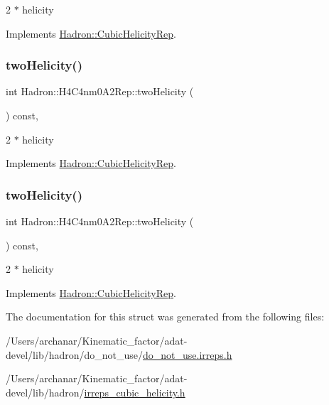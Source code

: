 2 $\ast$ helicity 

Implements \mbox{\hyperlink{structHadron_1_1CubicHelicityRep_af507aa56fc2747eacc8cb6c96db31ecc}{Hadron\+::\+Cubic\+Helicity\+Rep}}.

\mbox{\label{structHadron_1_1H4C4nm0A2Rep_a347b2b7af8f9ebd8468f2de11f0b6894}} 
\subsubsection{\texorpdfstring{twoHelicity()}{twoHelicity()}\hspace{0.1cm}{\footnotesize\ttfamily [2/3]}}
{\footnotesize\ttfamily int Hadron\+::\+H4\+C4nm0\+A2\+Rep\+::two\+Helicity (\begin{DoxyParamCaption}{ }\end{DoxyParamCaption}) const\hspace{0.3cm}{\ttfamily [inline]}, {\ttfamily [virtual]}}

2 $\ast$ helicity 

Implements \mbox{\hyperlink{structHadron_1_1CubicHelicityRep_af507aa56fc2747eacc8cb6c96db31ecc}{Hadron\+::\+Cubic\+Helicity\+Rep}}.

\mbox{\label{structHadron_1_1H4C4nm0A2Rep_a347b2b7af8f9ebd8468f2de11f0b6894}} 
\subsubsection{\texorpdfstring{twoHelicity()}{twoHelicity()}\hspace{0.1cm}{\footnotesize\ttfamily [3/3]}}
{\footnotesize\ttfamily int Hadron\+::\+H4\+C4nm0\+A2\+Rep\+::two\+Helicity (\begin{DoxyParamCaption}{ }\end{DoxyParamCaption}) const\hspace{0.3cm}{\ttfamily [inline]}, {\ttfamily [virtual]}}

2 $\ast$ helicity 

Implements \mbox{\hyperlink{structHadron_1_1CubicHelicityRep_af507aa56fc2747eacc8cb6c96db31ecc}{Hadron\+::\+Cubic\+Helicity\+Rep}}.



The documentation for this struct was generated from the following files\+:\begin{DoxyCompactItemize}
\item 
/\+Users/archanar/\+Kinematic\+\_\+factor/adat-\/devel/lib/hadron/do\+\_\+not\+\_\+use/\mbox{\hyperlink{adat-devel_2lib_2hadron_2do__not__use_2do__not__use_8irreps_8h}{do\+\_\+not\+\_\+use.\+irreps.\+h}}\item 
/\+Users/archanar/\+Kinematic\+\_\+factor/adat-\/devel/lib/hadron/\mbox{\hyperlink{adat-devel_2lib_2hadron_2irreps__cubic__helicity_8h}{irreps\+\_\+cubic\+\_\+helicity.\+h}}\end{DoxyCompactItemize}
